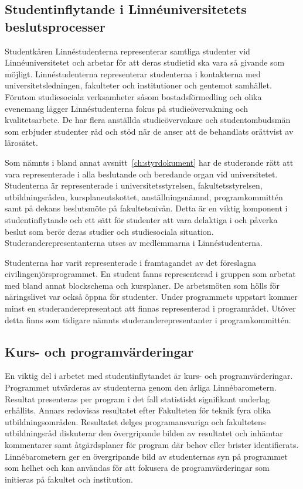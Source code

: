\subsection{Studentinflytande i Linnéuniversitetets beslutsprocesser}

Studentkåren Linnéstudenterna representerar samtliga studenter vid Linnéuniversitetet och arbetar för att deras studietid ska vara så givande som möjligt. Linnéstudenterna representerar studenterna i kontakterna med universitetsledningen, fakulteter och institutioner och gentemot samhället. Förutom studiesociala verksamheter såsom bostadsförmedling och olika evenemang lägger Linnéstudenterna fokus på studieövervakning och kvalitetsarbete. De har flera anställda studieövervakare och studentombudsmän som erbjuder studenter råd och stöd när de anser att de behandlats orättvist av lärosätet.

Som nämnts i bland annat avsnitt~\ref{ch:styrdokument} har de studerande rätt att vara representerade i alla beslutande och beredande organ vid universitetet. Studenterna är representerade i universitetsstyrelsen, fakultetsstyrelsen, utbildningsråden, kursplaneutskottet, anställningsnämnd, programkommittén samt på dekans beslutsmöte på fakultetsnivån. Detta är en viktig komponent i studentinflytande och ett sätt för studenter att vara delaktiga i och påverka beslut som berör deras studier och studiesociala situation. Studeranderepresentanterna utses av medlemmarna i Linnéstudenterna.

Studenterna har varit representerade i framtagandet av det föreslagna civilingenjörsprogrammet. En student fanns representerad i gruppen som arbetat med bland annat blockschema och kursplaner. De arbetsmöten som hölls för näringslivet var också öppna för studenter. Under programmets uppstart kommer minst en studeranderepresentant att finnas representerad i programrådet. Utöver detta finns som tidigare nämnts studeranderepresentanter i programkommittén.

\subsection{Kurs- och programvärderingar}

En viktig del i arbetet med studentinflytandet är kurs- och programvärderingar. Programmet utvärderas av studenterna genom den årliga Linnébarometern. Resultat presenteras per program i det fall statistiskt signifikant underlag erhållits. Annars redovisas resultatet efter Fakulteten för teknik fyra olika utbildningsområden. Resultatet delges programansvariga och fakultetens utbildningsråd diskuterar den övergripande bilden av resultatet och inhämtar kommentarer samt åtgärdsplaner för program där behov eller brister identifierats. Linnébarometern ger en övergripande bild av studenternas syn på programmet som helhet och kan användas för att fokusera de programvärderingar som initieras på fakultet och institution.

